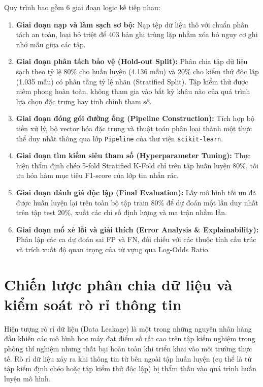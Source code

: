 Quy trình bao gồm 6 giai đoạn logic kế tiếp nhau:
\begin{enumerate}
    \item \textbf{Giai đoạn nạp và làm sạch sơ bộ:} Nạp tệp dữ liệu thô với chuẩn phân tách an toàn, loại bỏ triệt để 403 bản ghi trùng lặp nhằm xóa bỏ nguy cơ ghi nhớ mẫu giữa các tập.
    \item \textbf{Giai đoạn phân tách bảo vệ (Hold-out Split):} Phân chia tập dữ liệu sạch theo tỷ lệ 80\% cho huấn luyện (4.136 mẫu) và 20\% cho kiểm thử độc lập (1.035 mẫu) có phân tầng tỷ lệ nhãn (Stratified Split). Tập kiểm thử được niêm phong hoàn toàn, không tham gia vào bất kỳ khâu nào của quá trình lựa chọn đặc trưng hay tinh chỉnh tham số.
    \item \textbf{Giai đoạn đóng gói đường ống (Pipeline Construction):} Tích hợp bộ tiền xử lý, bộ vector hóa đặc trưng và thuật toán phân loại thành một thực thể duy nhất thông qua lớp \texttt{Pipeline} của thư viện \texttt{scikit-learn}.
    \item \textbf{Giai đoạn tìm kiếm siêu tham số (Hyperparameter Tuning):} Thực hiện thẩm định chéo 5-fold Stratified K-Fold chỉ trên tập huấn luyện 80\%, tối ưu hóa hàm mục tiêu F1-score của lớp tin nhắn rác.
    \item \textbf{Giai đoạn đánh giá độc lập (Final Evaluation):} Lấy mô hình tối ưu đã được huấn luyện lại trên toàn bộ tập train 80\% để dự đoán một lần duy nhất trên tập test 20\%, xuất các chỉ số định lượng và ma trận nhầm lẫn.
    \item \textbf{Giai đoạn mổ xẻ lỗi và giải thích (Error Analysis \& Explainability):} Phân lập các ca dự đoán sai FP và FN, đối chiếu với các thuộc tính cấu trúc và trích xuất độ quan trọng của từ vựng qua Log-Odds Ratio.
\end{enumerate}

\section{Chiến lược phân chia dữ liệu và kiểm soát rò rỉ thông tin}
\label{sec:kiem-soat-leakage}

Hiện tượng rò rỉ dữ liệu (Data Leakage) là một trong những nguyên nhân hàng đầu khiến các mô hình học máy đạt điểm số rất cao trên tập kiểm nghiệm trong phòng thí nghiệm nhưng thất bại hoàn toàn khi triển khai vào môi trường thực tế. Rò rỉ dữ liệu xảy ra khi thông tin từ bên ngoài tập huấn luyện (cụ thể là từ tập kiểm định chéo hoặc tập kiểm thử độc lập) bị thẩm thấu vào quá trình huấn luyện mô hình.

